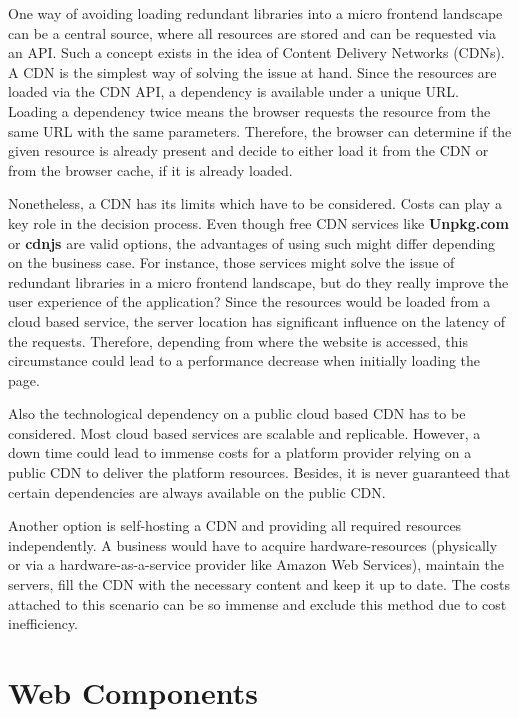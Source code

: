 One way of avoiding loading redundant libraries into a micro frontend landscape can be a central source, where all resources are stored and can be requested via an API. Such a concept exists in the idea of Content Delivery Networks (CDNs).
A CDN is the simplest way of solving the issue at hand. Since the resources are loaded via the CDN API, a dependency is available under a unique URL. Loading a dependency twice means the browser requests the resource from the same URL with the same parameters. Therefore, the browser can determine if the given resource is already present and decide to either load it from the CDN or from the browser cache, if it is already loaded.

Nonetheless, a CDN has its limits which have to be considered. Costs can play a key role in the decision process.
Even though free CDN services like \textbf{Unpkg.com} or \textbf{cdnjs} are valid options, the advantages of using such might differ depending on the business case.
For instance, those services might solve the issue of redundant libraries in a micro frontend landscape, but do they really improve the user experience of the application? 
Since the resources would be loaded from a cloud based service, the server location has significant influence on the latency of the requests. Therefore, depending from where the website is accessed, this circumstance could lead to a performance decrease when initially loading the page.

Also the technological dependency on a public cloud based CDN has to be considered. Most cloud based services are scalable and replicable. However, a down time could lead to immense costs for a platform provider relying on a public CDN to deliver the platform resources.
Besides, it is never guaranteed that certain dependencies are always available on the public CDN.

Another option is self-hosting a CDN and providing all required resources independently. A business would have to acquire hardware-resources (physically or via a hardware-as-a-service provider like Amazon Web Services), maintain the servers, fill the CDN with the necessary content and keep it up to date. The costs attached to this scenario can be so immense and exclude this method due to cost inefficiency.\cite{Meassuring_a_commercial_CDN}

\section{Web Components}

